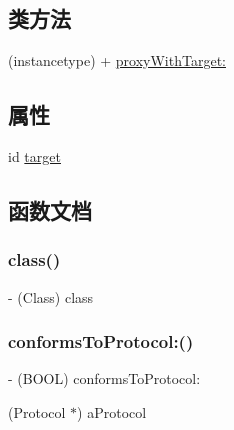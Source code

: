 \subsection*{类方法}
\begin{DoxyCompactItemize}
\item 
(instancetype) + \hyperlink{interface_m_a_r_weak_proxy_ae1ace9d51ef3e4b0a66ed0bc9c5534c8}{proxy\+With\+Target\+:}
\end{DoxyCompactItemize}
\subsection*{属性}
\begin{DoxyCompactItemize}
\item 
id \hyperlink{interface_m_a_r_weak_proxy_ab15eccc6644a15d3cc80d6f44b4af97b}{target}
\end{DoxyCompactItemize}


\subsection{函数文档}
\mbox{\label{interface_m_a_r_weak_proxy_a37f22c27e38c3245d990b70373f246e2}} 
\subsubsection{\texorpdfstring{class()}{class()}}
{\footnotesize\ttfamily -\/ (Class) class \begin{DoxyParamCaption}{ }\end{DoxyParamCaption}\hspace{0.3cm}{\ttfamily [implementation]}}

\mbox{\label{interface_m_a_r_weak_proxy_abc6ecb34f5f4257836ae198608c0e592}} 
\subsubsection{\texorpdfstring{conforms\+To\+Protocol\+:()}{conformsToProtocol:()}}
{\footnotesize\ttfamily -\/ (B\+O\+OL) conforms\+To\+Protocol\+: \begin{DoxyParamCaption}\item[{(Protocol $\ast$)}]{a\+Protocol }\end{DoxyParamCaption}\hspace{0.3cm}{\ttfamily [implementation]}}

